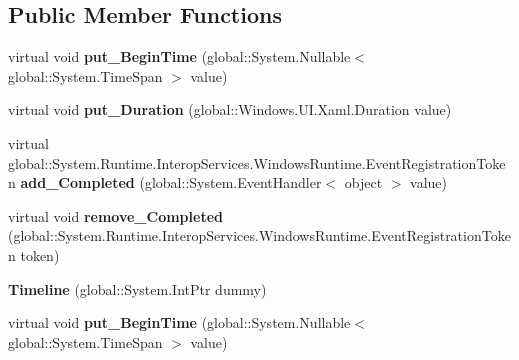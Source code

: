 \subsection*{Public Member Functions}
\begin{DoxyCompactItemize}
\item 
\mbox{\label{class_windows_1_1_u_i_1_1_xaml_1_1_media_1_1_animation_1_1_timeline_aae3a485326665861681d7ef24e8bed71}} 
virtual void {\bfseries put\+\_\+\+Begin\+Time} (global\+::\+System.\+Nullable$<$ global\+::\+System.\+Time\+Span $>$ value)
\item 
\mbox{\label{class_windows_1_1_u_i_1_1_xaml_1_1_media_1_1_animation_1_1_timeline_ad18ba23ca70f9feb87ff33751276ed17}} 
virtual void {\bfseries put\+\_\+\+Duration} (global\+::\+Windows.\+U\+I.\+Xaml.\+Duration value)
\item 
\mbox{\label{class_windows_1_1_u_i_1_1_xaml_1_1_media_1_1_animation_1_1_timeline_a06df3c15f47b53c7bde83e2c99016be0}} 
virtual global\+::\+System.\+Runtime.\+Interop\+Services.\+Windows\+Runtime.\+Event\+Registration\+Token {\bfseries add\+\_\+\+Completed} (global\+::\+System.\+Event\+Handler$<$ object $>$ value)
\item 
\mbox{\label{class_windows_1_1_u_i_1_1_xaml_1_1_media_1_1_animation_1_1_timeline_abd69089a61fd390f3e7496347cf7afbd}} 
virtual void {\bfseries remove\+\_\+\+Completed} (global\+::\+System.\+Runtime.\+Interop\+Services.\+Windows\+Runtime.\+Event\+Registration\+Token token)
\item 
\mbox{\label{class_windows_1_1_u_i_1_1_xaml_1_1_media_1_1_animation_1_1_timeline_ad9fb777f9fbd5b9e59022ab3cbcde141}} 
{\bfseries Timeline} (global\+::\+System.\+Int\+Ptr dummy)
\item 
\mbox{\label{class_windows_1_1_u_i_1_1_xaml_1_1_media_1_1_animation_1_1_timeline_aae3a485326665861681d7ef24e8bed71}} 
virtual void {\bfseries put\+\_\+\+Begin\+Time} (global\+::\+System.\+Nullable$<$ global\+::\+System.\+Time\+Span $>$ value)

\end{DoxyCompactItemize}
